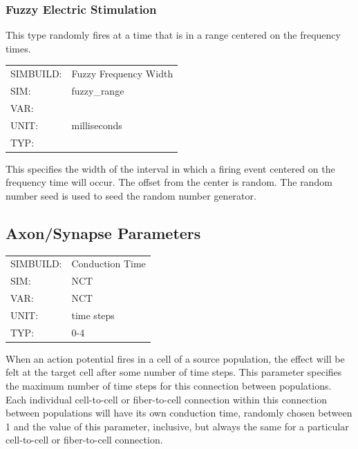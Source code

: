 \documentclass[12pt,openany,oneside]{book}
\begin{document}
\subsubsection{Fuzzy Electric Stimulation}
\label{Fuzzy Electric Stimulation}
This type randomly fires at a time that is in a range centered on the
frequency times.

\begin{flushleft}
\begin{tabular}{@{}ll@{}}
SIMBUILD: & Fuzzy Frequency Width\\
SIM: & fuzzy\_range\\
VAR: &\\
UNIT: & milliseconds\\
TYP: &\\
\end{tabular}
\end{flushleft}
\noindent
This specifies the width of the interval in which a firing event centered
on the frequency time will occur. The offset from the center is random.
The random number seed is used to seed the random number generator.
\filbreak
\vspace{\baselineskip}

\subsection{Axon/Synapse Parameters}
\label{Axon Parameters}

\begin{flushleft}
\begin{tabular}{@{}ll@{}}
SIMBUILD: & Conduction Time\\
SIM: & NCT\\
VAR: & NCT\\
UNIT: & time steps\\
TYP: & 0-4\\
\end{tabular}
\end{flushleft}
\noindent
When an action potential fires in a cell of a source population, the
effect will be felt at the target cell after some number of time
steps. This parameter specifies the maximum number of time steps for
this connection between populations. Each individual cell-to-cell or
fiber-to-cell connection within this connection between populations
will have its own conduction time, randomly chosen between 1 and the
value of this parameter, inclusive, but always the same for a
particular cell-to-cell or fiber-to-cell connection.
\filbreak
\vspace{\baselineskip}
\end{document}
